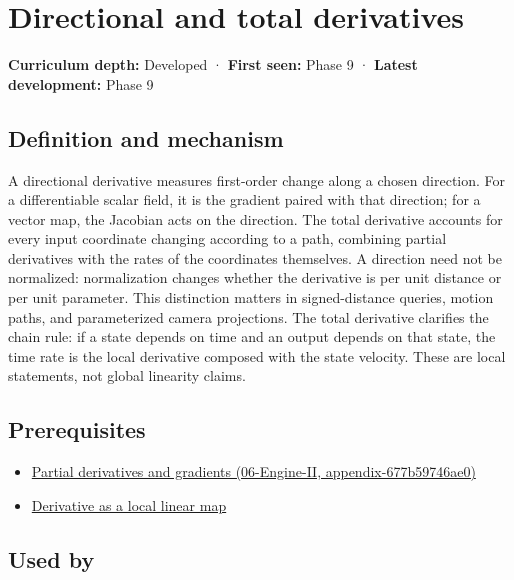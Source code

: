 \hypertarget{appendix-e2d476574aab}{}
\section{Directional and total derivatives}\label{appendix-e2d476574aab-directional-and-total-derivatives}

\textbf{Curriculum depth:} Developed · \textbf{First seen:} Phase 9 · \textbf{Latest development:} Phase 9

\subsection{Definition and mechanism}\label{appendix-e2d476574aab-definition-and-mechanism}

A directional derivative measures first-order change along a chosen direction. For a differentiable scalar field, it is the gradient paired with that direction; for a vector map, the Jacobian acts on the direction. The total derivative accounts for every input coordinate changing according to a path, combining partial derivatives with the rates of the coordinates themselves. A direction need not be normalized: normalization changes whether the derivative is per unit distance or per unit parameter. This distinction matters in signed-distance queries, motion paths, and parameterized camera projections. The total derivative clarifies the chain rule: if a state depends on time and an output depends on that state, the time rate is the local derivative composed with the state velocity. These are local statements, not global linearity claims.

\subsection{Prerequisites}\label{appendix-e2d476574aab-prerequisites}

\begin{itemize}
\tightlist
\item
  \href{../06-Engine-II/main.pdf\#nameddest=appendix-677b59746ae0}{Partial derivatives and gradients (06-Engine-II, appendix-677b59746ae0)}
\item
  \hyperref[appendix-7bc181935c42]{Derivative as a local linear map}
\end{itemize}

\subsection{Used by}\label{appendix-e2d476574aab-used-by}

